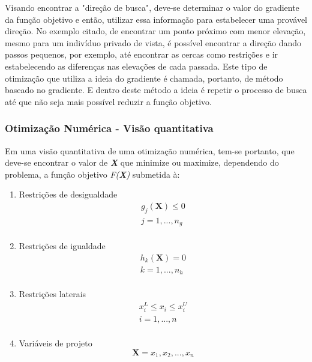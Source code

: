 Visando encontrar a "direção de busca", deve-se determinar o valor do gradiente da função objetivo e então, utilizar essa informação para estabelecer uma provável direção. No exemplo citado, de encontrar um ponto próximo com menor elevação, mesmo para um indivíduo privado de vista, é possível encontrar a direção dando passos pequenos, por exemplo, até encontrar as cercas como restrições e ir estabelecendo as diferenças nas elevações de cada passada. Este tipo de otimização que utiliza a ideia do gradiente é chamada, portanto, de método baseado no gradiente. E dentro deste método a ideia é repetir o processo de busca até que não seja mais possível reduzir a função objetivo.

\subsubsection{Otimização Numérica - Visão quantitativa}
Em uma visão quantitativa de uma otimização numérica, tem-se portanto, que deve-se encontrar o valor de \emph{\textbf{X}} que minimize ou maximize, dependendo do problema, a função objetivo \emph{F(\textbf{X})} submetida à:

\begin{enumerate}
\item Restrições de desigualdade
\begin{equation} \label{otimization_1}
\begin{split}
g_{j}(\textbf{X})\leq0 \\
j = 1, ..., n_{g}\\
\end{split}
\end{equation}
\item Restrições de igualdade
\begin{equation} \label{otimization_2}
\begin{split}
h_{k}(\textbf{X})=0 \\
k = 1, ..., n_{h}\\
\end{split}
\end{equation}
\item Restrições laterais
\begin{equation} \label{otimization_3}
\begin{split}
x_{i}^L \leq x_{i}\leq x_{i}^U  \\
i = 1, ..., n\\
\end{split}
\end{equation}
\item Variáveis de projeto
\begin{equation} \label{otimization_4}
\textbf{X} = {x_{1}, x_{2}, ..., x_{n}}
\end{equation}

\end {enumerate}

